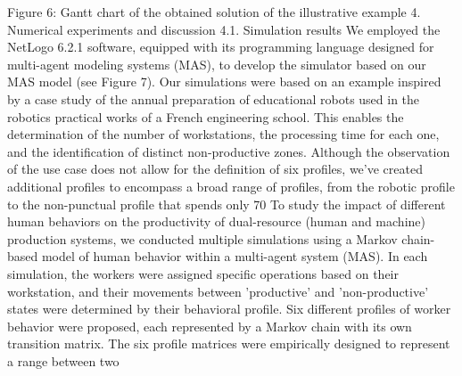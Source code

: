 Figure 6: Gantt chart of the obtained solution of the illustrative example
4.	Numerical experiments and discussion
4.1.	Simulation results
We employed the NetLogo 6.2.1 software, equipped with its programming language designed for multi-agent modeling systems (MAS), to develop the simulator based on our MAS model (see Figure 7). Our simulations were based on an example inspired by a case study of the annual preparation of educational robots used in the robotics practical works of a French engineering school. This enables the determination of the number of workstations, the processing time for each one, and the identification of distinct non-productive zones. Although the observation of the use case does not allow for the definition of six profiles, we’ve created additional profiles to encompass a broad range of profiles, from the robotic profile to the non-punctual profile that spends only 70%
To study the impact of different human behaviors on the productivity of dual-resource (human and machine) production systems, we conducted multiple simulations using a Markov chain-based model of human behavior within a multi-agent system (MAS). In each simulation, the workers were assigned specific operations based on their workstation, and their movements between ’productive’ and ’non-productive’ states were determined by their behavioral profile. Six different profiles of worker behavior were proposed, each represented by a Markov chain with its own transition matrix. The six profile matrices were empirically designed to represent a range between two
 
